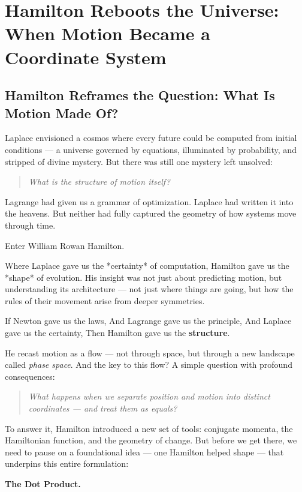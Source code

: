 \section{Hamilton Reboots the Universe: When Motion Became a Coordinate System}

\subsection{Hamilton Reframes the Question: What Is Motion Made Of?}

Laplace envisioned a cosmos where every future could be computed from initial conditions — a universe governed by equations, illuminated by probability, and stripped of divine mystery.  
But there was still one mystery left unsolved:

\begin{quote}
\textit{What is the structure of motion itself?}
\end{quote}

Lagrange had given us a grammar of optimization. Laplace had written it into the heavens. But neither had fully captured the geometry of how systems move through time.

Enter William Rowan Hamilton.

Where Laplace gave us the *certainty* of computation, Hamilton gave us the *shape* of evolution. His insight was not just about predicting motion, but understanding its architecture — not just where things are going, but how the rules of their movement arise from deeper symmetries.

If Newton gave us the laws,  
And Lagrange gave us the principle,  
And Laplace gave us the certainty,  
Then Hamilton gave us the \textbf{structure}.

He recast motion as a flow — not through space, but through a new landscape called \textit{phase space}. And the key to this flow? A simple question with profound consequences:

\begin{quote}
\textit{What happens when we separate position and motion into distinct coordinates — and treat them as equals?}
\end{quote}

To answer it, Hamilton introduced a new set of tools: conjugate momenta, the Hamiltonian function, and the geometry of change. But before we get there, we need to pause on a foundational idea — one Hamilton helped shape — that underpins this entire formulation:

\vspace{1em}
\begin{center}
\Large\textbf{The Dot Product.}
\end{center}

